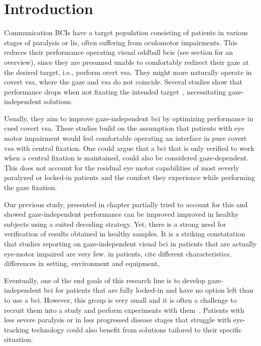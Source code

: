 \section{Introduction}

Communication BCIs have a target population consisting of patients in various
stages of paralysis or \ac{lis}, often suffering from oculomotor impairments.
This reduces their performance operating visual oddball \ac{bci}s (see
section for an overview), since they
are presumed unable to comfortably redirect their gaze at the desired target,
i.e., perform overt \ac{vsa}.
They might more naturally operate in covert \ac{vsa}, where the gaze and
\ac{vsa} do not coincide.
Several studies show that performance drops when not fixating the intended
target~\cite{Brunner2010, Frenzel2011, Treder2010, RonAngevin2019,
VanDenKerchove2024}, necessitating gaze-independent solutions.

Usually, they aim to improve gaze-independent \ac{bci} by optimizing
performance in cued covert \ac{vsa}.
These studies build on the assumption that patients with eye motor impairment
would feel comfortable operating an interface in pure covert \ac{vsa} with
central fixation.
One could argue that a \ac{bci} that is only verified to work when a central
fixation is maintained, could also be considered gaze-dependent.
This does not account for the residual eye motor capabilities of most severly
paralyzed or locked-in patients and the comfort they experience while
performing the gaze fixation.

Our previous study, presented in chapter   partially tried to account for this
and showed gaze-independent performance can be improved
improved in healthy subjects using a suited decoding strategy.
Yet, there is a strong need for verification of results obtained in healthy
samples.
It is a striking constatation that studies reporting on
gaze-independent visual \ac{bci} in patients that are actually eye-motor
impaired are very few.
in patients, cite different characteristics, differences
in setting, environment and equipment,

Eventually, one of the end goals of this research line is to develop
gaze-independent \ac{bci} for patients that
are fully locked-in and have no option left than to use a \ac{bci}.
However, this group is very small and it is often a challenge to recruit them
into a study and perform experiments with them~\cite{Wolpaw2006}.
Patients with less severe paralysis or in less progressed disease stages that struggle with
eye-tracking technology could also benefit from
solutions tailored to their specific situation.

